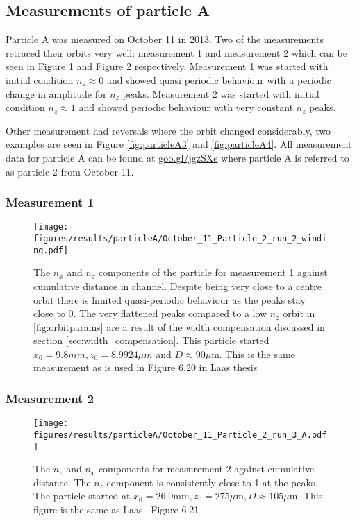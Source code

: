 \subsection{Measurements of particle A}
Particle A was measured on October 11 in 2013. Two of the measurements retraced their orbits very well: measurement 1 and measurement 2 which can be seen in Figure \ref{fig:particleA1} and Figure \ref{fig:particleA2} respectively. Measurement 1 was started with initial condition $n_z \approx 0$ and showed quasi periodic behaviour with a periodic change in amplitude for $n_z$ peaks. Measurement 2 was started with initial condition $n_z \approx 1$ and showed periodic behaviour with very constant $n_z$ peaks. 

Other measurement had reversals where the orbit changed considerably, two examples are seen in Figure \ref{fig:particleA3} and \ref{fig:particleA4}. All measurement data for particle A can be found at \url{goo.gl/jgzSXe} where particle A is referred to as particle 2 from October 11. 


\subsubsection{Measurement 1}
\begin{figure}[H]
\begin{center}
\texttt{[image: figures/results/particleA/October\_11\_Particle\_2\_run\_2\_winding.pdf]}
\end{center}
\caption{The $n_x$ and $n_z$ components of the particle for measurement 1 against cumulative distance in channel. Despite being very close to a centre orbit there is limited quasi-periodic behaviour as the peaks stay close to 0. The very flattened peaks compared to a low $n_z$ orbit in \ref{fig:orbitparams} are a result of the width compensation discussed in section \ref{sec:width_compensation}. This particle started $x_0 = 9.8 mm, z_0 = 8.9924 \mu m$ and $D \approx 90\mu$m. This is the same measurement as is used in Figure 6.20 in Laas thesis~\cite{alexanderThesis}}
\label{fig:particleA1}
\end{figure}


\subsubsection{Measurement 2}
\begin{figure}[H]
\begin{center}
\texttt{[image: figures/results/particleA/October\_11\_Particle\_2\_run\_3\_A.pdf]}
\end{center}
\caption{The $n_z$ and $n_x$ components for measurement 2 against cumulative distance. The $n_z$ component is consistently close to 1 at the peaks. 
The particle started at $ x_0 = 26.0 \text{mm}, z_0 = 275\mu\text{m}, D\approx 105\mu$m. This figure is the same as Laas~\cite{alexanderThesis} Figure 6.21}
\label{fig:particleA2}
\end{figure}

